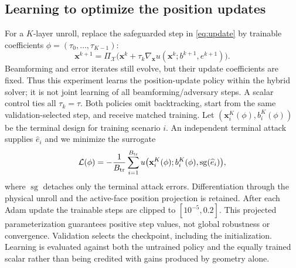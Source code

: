 \documentclass[10pt,journal,onecolumn,draftclsnofoot]{IEEEtran}
\newcommand{\xx}{\mathbf x}
\begin{document}
\subsection{Learning to optimize the position updates}
For a $K$-layer unroll, replace the safeguarded step in
\eqref{eq:update} by trainable coefficients
$\phi=(\tau_0,\ldots,\tau_{K-1})$:
\begin{equation}
 \xx^{k+1}=\Pi_{\mathcal X}\bigl(\xx^k+\tau_k\nabla_{\xx}u(\xx^k;b^{k+1},e^{k+1})\bigr).
 \label{eq:l2o}
\end{equation}
Beamforming and error iterates still evolve, but their update coefficients
are fixed. Thus this experiment learns the position-update policy within the
hybrid solver; it is not joint learning of all beamforming/adversary steps.
A scalar control ties all $\tau_k=\tau$. Both policies omit backtracking,
start from the same validation-selected step, and receive matched training.
Let $(\xx_i^K(\phi),b_i^K(\phi))$ be the terminal design for training
scenario $i$. An independent terminal attack supplies $\widehat e_i$ and
we minimize the surrogate
\begin{equation}
 \mathcal L(\phi)=-\frac{1}{B_{\rm tr}}\sum_{i=1}^{B_{\rm tr}}
 u\bigl(\xx_i^K(\phi);b_i^K(\phi),\operatorname{sg}(\widehat e_i)\bigr),
 \label{eq:train}
\end{equation}
where $\operatorname{sg}$ detaches only the terminal attack errors.
Differentiation through the physical unroll and the active-face position
projection is retained. After each Adam update the trainable steps are
clipped to $[10^{-5},0.2]$. This projected parameterization guarantees
positive step values, not global robustness or convergence. Validation selects
the checkpoint, including the initialization. Learning is evaluated against
both the untrained policy and the equally trained scalar rather than being
credited with gains produced by geometry alone.
\end{document}
